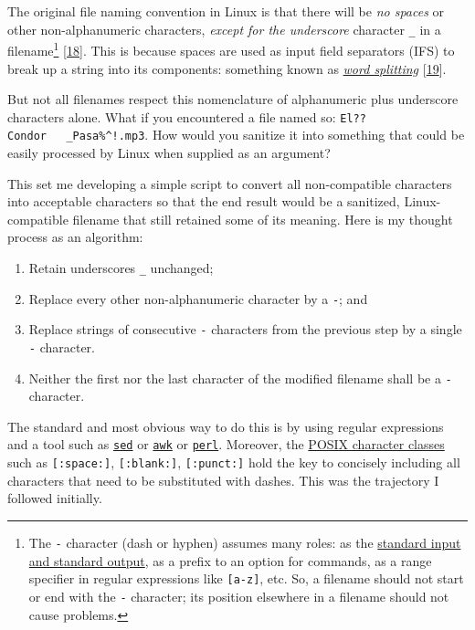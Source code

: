 \documentclass[
  a4paper,
]{article}
\providecommand{\tightlist}{%
  \setlength{\itemsep}{0pt}\setlength{\parskip}{0pt}}
\begin{document}
The original file naming convention in Linux is that there will be
\emph{no spaces} or other non-alphanumeric characters, \emph{except for
the underscore} character \texttt{\_} in a filename\footnote{The
  \texttt{-} character (dash or hyphen) assumes many roles: as the
  \href{https://en.wikipedia.org/wiki/Standard_streams}{standard input
  and standard output}, as a prefix to an option for commands, as a
  range specifier in regular expressions like \texttt{{[}a-z{]}}, etc.
  So, a filename should not start or end with the \texttt{-} character;
  its position elsewhere in a filename should not cause problems.}
{[}\protect\hyperlink{ref-unix}{18}{]}. This is because spaces are used
as input field separators (IFS) to break up a string into its
components: something known as
\href{https://mywiki.wooledge.org/WordSplitting?highlight=\%28spaces\%29\%7C\%28word\%29\%7C\%28splitting\%29}{\emph{word
splitting}} {[}\protect\hyperlink{ref-wordsplitting}{19}{]}.

But not all filenames respect this nomenclature of alphanumeric plus
underscore characters alone. What if you encountered a file named so:
\texttt{El??Condor\ \ \ \_Pasa\%\^{}!.mp3}. How would you sanitize it
into something that could be easily processed by Linux when supplied as
an argument?

This set me developing a simple script to convert all non-compatible
characters into acceptable characters so that the end result would be a
sanitized, Linux-compatible filename that still retained some of its
meaning. Here is my thought process as an algorithm:

\begin{enumerate}
\tightlist
\item
  Retain underscores \texttt{\_} unchanged;
\item
  Replace every other non-alphanumeric character by a \texttt{-}; and
\item
  Replace strings of consecutive \texttt{-} characters from the previous
  step by a single \texttt{-} character.
\item
  Neither the first nor the last character of the modified filename
  shall be a \texttt{-} character.
\end{enumerate}

The standard and most obvious way to do this is by using regular
expressions and a tool such as
\href{https://www.grymoire.com/Unix/Sed.html}{\texttt{sed}} or
\href{https://tldp.org/LDP/abs/html/awk.html}{\texttt{awk}} or
\href{https://perldoc.perl.org/perlretut}{\texttt{perl}}. Moreover, the
\href{https://www.regular-expressions.info/posixbrackets.html}{POSIX
character classes} such as \texttt{{[}:space:{]}},
\texttt{{[}:blank:{]}}, \texttt{{[}:punct:{]}} hold the key to concisely
including all characters that need to be substituted with dashes. This
was the trajectory I followed initially.
\end{document}
